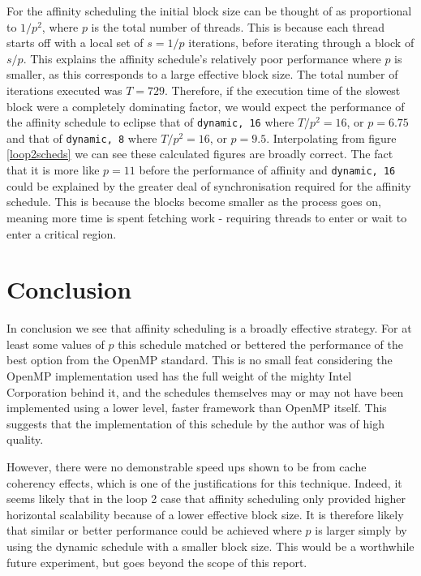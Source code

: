 \documentclass[a4paper,12pt]{article}
\begin{document}
For the affinity scheduling the initial block size can be thought of as proportional to $1/p^2$, where $p$ is the total number of threads. This is because each thread starts off with a local set of $s=1/p$ iterations, before iterating through a block of $s/p$. This explains the affinity schedule's relatively poor performance where $p$ is smaller, as this corresponds to a large effective block size. The total number of iterations executed was $T=729$. Therefore, if the execution time of the slowest block were a completely dominating factor, we would expect the performance of the affinity schedule to eclipse that of \verb|dynamic, 16| where $T/p^2 = 16$, or $p = 6.75$ and that of \verb|dynamic, 8| where $T/p^2 = 16$, or $p = 9.5$. Interpolating from figure \ref{loop2scheds} we can see these calculated figures are broadly correct. The fact that it is more like $p=11$ before the performance of affinity and \verb|dynamic, 16| could be explained by the greater deal of synchronisation required for the affinity schedule. This is because the blocks become smaller as the process goes on, meaning more time is spent fetching work - requiring threads to enter or wait to enter a critical region. 

\section{Conclusion}
In conclusion we see that affinity scheduling is a broadly effective strategy. For at least some values of $p$ this schedule matched or bettered the performance of the best option from the OpenMP standard. This is no small feat considering the OpenMP implementation used has the full weight of the mighty Intel Corporation behind it, and the schedules themselves may or may not have been implemented using a lower level, faster framework than OpenMP itself. This suggests that the implementation of this schedule by the author was of high quality.

However, there were no demonstrable speed ups shown to be from cache coherency effects, which is one of the justifications for this technique. Indeed, it seems likely that in the loop 2 case that affinity scheduling only provided higher horizontal scalability because of a lower effective block size. It is therefore likely that similar or better performance could be achieved where $p$ is larger simply by using the dynamic schedule with a smaller block size. This would be a worthwhile future experiment, but goes beyond the scope of this report.
\end{document}
